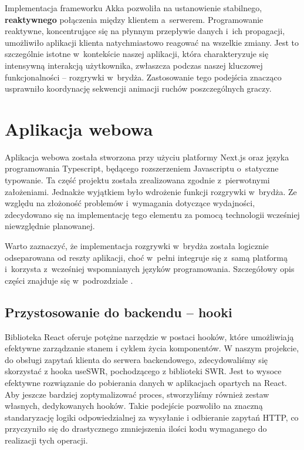 Implementacja frameworku Akka pozwoliła na ustanowienie stabilnego,
\textbf{reaktywnego} połączenia między klientem a~serwerem. Programowanie
reaktywne, koncentrujące się na płynnym przepływie danych i~ich propagacji,
umożliwiło aplikacji klienta natychmiastowo reagować na wszelkie zmiany. Jest
to szczególnie istotne w~kontekście naszej aplikacji, która charakteryzuje
się intensywną interakcją użytkownika, zwłaszcza podczas naszej kluczowej
funkcjonalności -- rozgrywki w~brydża. Zastosowanie tego podejścia
znacząco usprawniło koordynację sekwencji animacji ruchów poszczególnych
graczy.


\section{Aplikacja webowa}
Aplikacja webowa została stworzona przy użyciu platformy Next.js oraz
języka programowania Typescript, będącego rozszerzeniem Javascriptu
o~statyczne typowanie. Ta część projektu została zrealizowana zgodnie
z~pierwotnymi założeniami. Jednakże wyjątkiem było wdrożenie funkcji
rozgrywki w~brydża. Ze względu na złożoność problemów i~wymagania
dotyczące wydajności, zdecydowano się na implementację tego elementu za
pomocą technologii wcześniej niewzględnie planowanej.

Warto zaznaczyć, że implementacja rozgrywki w~brydża została logicznie
odseparowana od reszty aplikacji, choć w~pełni integruje się z~samą
platformą i~korzysta z~wcześniej wspomnianych języków programowania.
Szczegółowy opis części znajduje się w~podrozdziale .


\subsection{Przystosowanie do backendu -- hooki}
Biblioteka React oferuje potężne narzędzie w postaci hooków, które umożliwiają efektywne zarządzanie stanem i cyklem życia komponentów. W naszym projekcie, do obsługi zapytań klienta do serwera backendowego, zdecydowaliśmy się skorzystać z hooka useSWR, pochodzącego z biblioteki SWR. Jest to wysoce efektywne rozwiązanie do pobierania danych w aplikacjach opartych na React. Aby jeszcze bardziej zoptymalizować proces, stworzyliśmy również zestaw własnych, dedykowanych hooków. Takie podejście pozwoliło na znaczną standaryzację logiki odpowiedzialnej za wysyłanie i odbieranie zapytań HTTP, co przyczyniło się do drastycznego zmniejszenia ilości kodu wymaganego do realizacji tych operacji.
